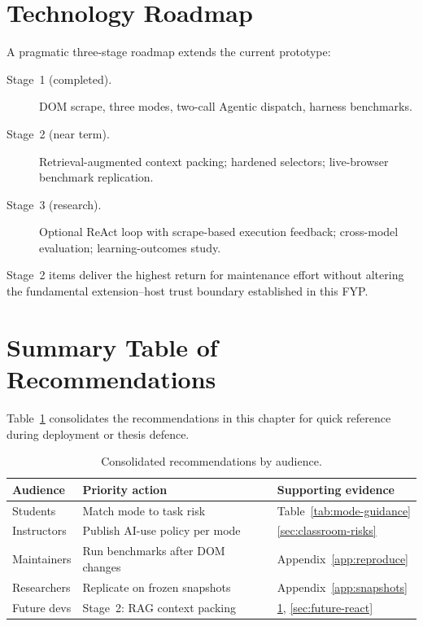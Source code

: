 \section{Technology Roadmap}
\label{sec:roadmap}

A pragmatic three-stage roadmap extends the current prototype:

\begin{description}
  \item[Stage~1 (completed).] DOM scrape, three modes, two-call Agentic dispatch, harness benchmarks.
  \item[Stage~2 (near term).] Retrieval-augmented context packing; hardened selectors; live-browser benchmark replication.
  \item[Stage~3 (research).] Optional ReAct loop with scrape-based execution feedback; cross-model evaluation; learning-outcomes study.
\end{description}

Stage~2 items deliver the highest return for maintenance effort without altering the fundamental extension--host trust boundary established in this FYP.

\section{Summary Table of Recommendations}
\label{sec:rec-summary}

Table~\ref{tab:rec-summary} consolidates the recommendations in this chapter for quick reference during deployment or thesis defence.

\begin{table}[!ht]
\centering
\caption{Consolidated recommendations by audience.}
\label{tab:rec-summary}
\small
\begin{tabular}{|p{2.8cm}|p{5.2cm}|p{5.2cm}|}
\hline
\textbf{Audience} & \textbf{Priority action} & \textbf{Supporting evidence} \\ \hline
Students & Match mode to task risk & Table~\ref{tab:mode-guidance} \\ \hline
Instructors & Publish AI-use policy per mode & \ref{sec:classroom-risks} \\ \hline
Maintainers & Run benchmarks after DOM changes & Appendix~\ref{app:reproduce} \\ \hline
Researchers & Replicate on frozen snapshots & Appendix~\ref{app:snapshots} \\ \hline
Future devs & Stage~2: RAG context packing & \ref{sec:roadmap}, \ref{sec:future-react} \\ \hline
\end{tabular}
\end{table}
